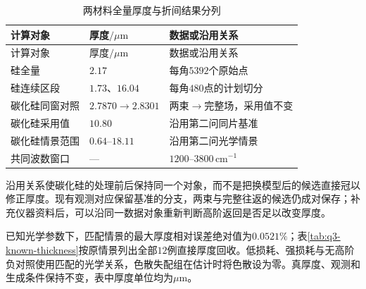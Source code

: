 \begingroup
\small
\renewcommand{\arraystretch}{1.06}
\setlength{\LTpre}{0pt}
\setlength{\LTpost}{0pt}
\begin{longtable}{>{\centering\arraybackslash}p{}>{\centering\arraybackslash}p{}>{\centering\arraybackslash}p{}}
\caption{两材料全量厚度与折间结果分列}\label{tab:q3-source-objects}\\
\toprule
计算对象 & 厚度$/\mu\mathrm{m}$ & 数据或沿用关系\\
\midrule
\endfirsthead
\toprule
计算对象 & 厚度$/\mu\mathrm{m}$ & 数据或沿用关系\\
\midrule
\endhead
\bottomrule
\endfoot
硅全量 & $2.17$ & 每角$5392$个原始点\\
硅连续区段 & $1.73$、$16.04$ & 每角$480$点的计划切分\\
碳化硅同窗对照 & $2.7870\to2.8301$ & 两束$\to$完整场，采用值不变\\
碳化硅采用值 & $10.80$ & 沿用第二问同片基准\\
碳化硅情景范围 & $0.64$--$18.11$ & 沿用第二问光学情景\\
共同波数窗口 & --- & $1200$--$3800\,\mathrm{cm}^{-1}$\\
\end{longtable}
\endgroup

沿用关系使碳化硅的处理前后保持同一个对象，而不是把换模型后的候选直接冠以修正厚度。现有观测对应保留基准的分支，两束与完整往返的候选仍成对保存；补充仪器资料后，可以沿同一数据对象重新判断高阶返回是否足以改变厚度。

已知光学参数下，匹配情景的最大厚度相对误差绝对值为$0.0521\%$；表\ref{tab:q3-known-thickness}按原情景列出全部$12$例直接厚度回收。低损耗、强损耗与无高阶负对照使用匹配的光学关系，色散失配组在估计时将色散设为零。真厚度、观测和生成条件保持不变，表中厚度单位均为$\mu\mathrm{m}$。

